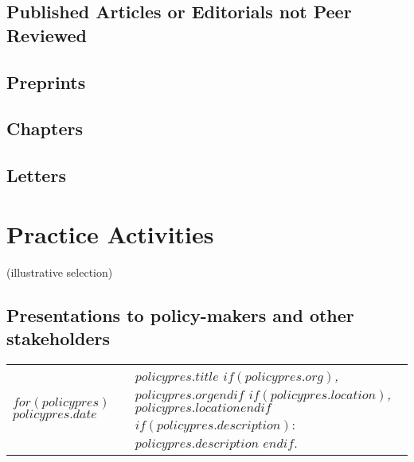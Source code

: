 \documentclass[martgin, line]{article}
\begin{document}
\subsection*{Published Articles or Editorials not Peer Reviewed}

\begin{enumerate}
  
\end{enumerate}


\subsection*{Preprints}

\begin{enumerate}
  
\end{enumerate}


\subsection*{Chapters}

\begin{enumerate}
  
\end{enumerate}

\subsection*{Letters}

\begin{enumerate}
  
\end{enumerate}


\section*{Practice Activities}

(illustrative selection)

\subsection*{Presentations to policy-makers and other stakeholders}


\setlength{\extrarowheight}{.75em}
\begin{longtable}[l]{lp{5in}}   
$for(policypres)$
$policypres.date$&
\parbox[t]{5in}{
    \textit{$policypres.title$%
    $if(policypres.org)$, $policypres.org$$endif$%
    $if(policypres.location)$, $policypres.location$$endif$}%
    $if(policypres.description)$: %
    $policypres.description$%
    $endif$.%
  }\\
$endfor$
\end{longtable}
\setlength{\extrarowheight}{0em}
\end{document}
